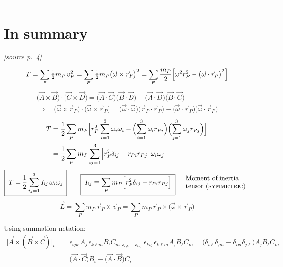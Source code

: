 \documentclass[11pt]{article}
\newcommand{\src}[1]{\par\nobreak\vspace{-4pt}\hfill{\footnotesize\itshape[source p.~#1]}\par\nobreak\vspace{2pt}}
\begin{document}
\bigskip\hrule\bigskip

\section*{In summary}
\src{4}

\begin{equation*}
T = \sum_P \tfrac{1}{2} m_P\,v_P^{2}
= \sum_P \tfrac{1}{2} m_P\bigl(\vec{\omega}\times\vec{r}_P\bigr)^{2}
= \sum_P \frac{m_P}{2}\Bigl[\omega^{2} r_P^{2} - \bigl(\vec{\omega}\cdot\vec{r}_P\bigr)^{2}\Bigr]
\end{equation*}
\begin{gather*}
\bigl(\vec{A}\times\vec{B}\bigr)\cdot\bigl(\vec{C}\times\vec{D}\bigr)
= \bigl(\vec{A}\cdot\vec{C}\bigr)\bigl(\vec{B}\cdot\vec{D}\bigr)-\bigl(\vec{A}\cdot\vec{D}\bigr)\bigl(\vec{B}\cdot\vec{C}\bigr)\\
\Longrightarrow\quad
\bigl(\vec{\omega}\times\vec{r}_P\bigr)\cdot\bigl(\vec{\omega}\times\vec{r}_P\bigr)
= \bigl(\vec{\omega}\cdot\vec{\omega}\bigr)\bigl(\vec{r}_P\cdot\vec{r}_P\bigr)
- \bigl(\vec{\omega}\cdot\vec{r}_P\bigr)\bigl(\vec{\omega}\cdot\vec{r}_P\bigr)
\end{gather*}
\begin{align*}
T &= \frac{1}{2}\sum_P m_P\Bigl[r_P^{2}\sum_{i=1}^{3}\omega_i\omega_i
- \Bigl(\sum_{i=1}^{3}\omega_i r_{Pi}\Bigr)\Bigl(\sum_{j=1}^{3}\omega_j r_{Pj}\Bigr)\Bigr]\\
&= \frac{1}{2}\sum_P m_P \sum_{ij=1}^{3}\Bigl[r_P^{2}\delta_{ij} - r_{Pi}r_{Pj}\Bigr]\omega_i\omega_j
\end{align*}
\begin{equation*}
\boxed{\;T = \frac{1}{2}\sum_{ij=1}^{3} I_{ij}\,\omega_i\omega_j\;}
\qquad
\boxed{\;I_{ij} \equiv \sum_P m_P\Bigl[r_P^{2}\delta_{ij} - r_{Pi}r_{Pj}\Bigr]\;}
\quad
\begin{array}{l}\text{Moment of inertia}\\ \text{tensor (\textsc{symmetric})}\end{array}
\end{equation*}
\begin{equation*}
\vec{L} = \sum_P m_P\,\vec{r}_P\times\vec{v}_P
= \sum_P m_P\,\vec{r}_P\times\bigl(\vec{\omega}\times\vec{r}_P\bigr)
\end{equation*}

\begin{aside}
Using summation notation:
\begin{align*}
\bigl[\vec{A}\times(\vec{B}\times\vec{C})\bigr]_i
&= \epsilon_{ijk}\,A_j\,\epsilon_{k\ell m}B_\ell C_m
\underset{\epsilon_{ijk}=\epsilon_{kij}}{=}
\epsilon_{kij}\,\epsilon_{k\ell m}A_j B_\ell C_m
= \bigl(\delta_{i\ell}\delta_{jm}-\delta_{im}\delta_{j\ell}\bigr)A_j B_\ell C_m\\
&= \bigl(\vec{A}\cdot\vec{C}\bigr)B_i - \bigl(\vec{A}\cdot\vec{B}\bigr)C_i
\end{align*}
\end{aside}
\end{document}
